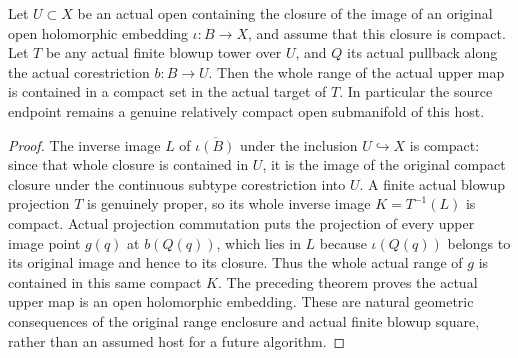 \begin{theorem}
\label{hir:actual-open-tower-compact-host}
Let $U\subset X$ be an actual open containing the closure of the image
of an original open holomorphic embedding $\iota:B\to X$, and assume
that this closure is compact. Let $T$ be any actual finite blowup
tower over $U$, and $Q$ its actual pullback along the actual
corestriction $b:B\to U$. Then the whole range of the actual upper
map is contained in a compact set in the actual target of $T$.
In particular the source endpoint remains a genuine relatively compact
open submanifold of this host.
\leanok
\end{theorem}
\begin{proof}
The inverse image $L$ of $\overline{\iota(B)}$ under the inclusion
$U\hookrightarrow X$ is compact: since that whole closure is contained
in $U$, it is the image of the original compact closure under the
continuous subtype corestriction into $U$. A finite actual blowup
projection $T$ is genuinely proper, so its whole inverse image
$K=T^{-1}(L)$ is compact. Actual projection commutation puts the
projection of every upper image point $g(q)$ at $b(Q(q))$, which lies
in $L$ because $\iota(Q(q))$ belongs to its original image and hence
to its closure. Thus the whole actual range of $g$ is contained in
this same compact $K$. The preceding theorem proves the actual upper
map is an open holomorphic embedding. These are natural geometric
consequences of the original range enclosure and actual finite
blowup square, rather than an assumed host for a future algorithm.
\end{proof}
